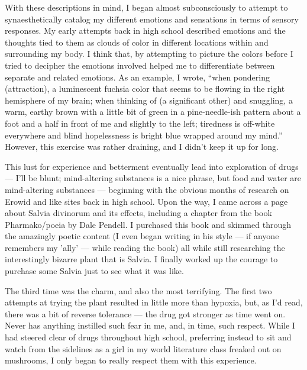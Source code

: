 With these descriptions in mind, I began almost subconsciously to attempt to synaesthetically catalog my different emotions and sensations in terms of sensory responses. My early attempts back in high school described emotions and the thoughts tied to them as clouds of color in different locations within and surrounding my body. I think that, by attempting to picture the colors before I tried to decipher the emotions involved helped me to differentiate between separate and related emotions. As an example, I wrote, ``when pondering (attraction), a luminescent fuchsia color that seems to be flowing in the right hemisphere of my brain; when thinking of (a significant other) and snuggling, a warm, earthy brown with a little bit of green in a pine-needle-ish pattern about a foot and a half in front of me and slightly to the left; tiredness is off-white everywhere and blind hopelessness is bright blue wrapped around my mind.'' However, this exercise was rather draining, and I didn't keep it up for long.

This lust for experience and betterment eventually lead into exploration of drugs --- I'll be blunt; mind-altering substances is a nice phrase, but food and water are mind-altering substances --- beginning with the obvious months of research on Erowid and like sites back in high school. Upon the way, I came across a page about Salvia divinorum and its effects, including a chapter from the book Pharmako/poeia by Dale Pendell. I purchased this book and skimmed through the amazingly poetic content (I even began writing in his style --- if anyone remembers my 'ally' --- while reading the book) all while still researching the interestingly bizarre plant that is Salvia. I finally worked up the courage to purchase some Salvia just to see what it was like.

The third time was the charm, and also the most terrifying. The first two attempts at trying the plant resulted in little more than hypoxia, but, as I'd read, there was a bit of reverse tolerance --- the drug got stronger as time went on. Never has anything instilled such fear in me, and, in time, such respect. While I had steered clear of drugs throughout high school, preferring instead to sit and watch from the sidelines as a girl in my world literature class freaked out on mushrooms, I only began to really respect them with this experience.

